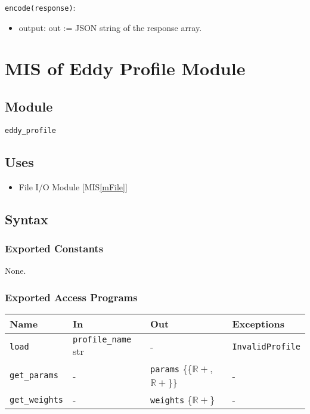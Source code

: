 \documentclass[12pt, titlepage]{article}
\begin{document}
\noindent \texttt{encode(response)}:
\begin{itemize}
  \item output: out := JSON string of the response array.
\end{itemize}

\newpage
\section{MIS of Eddy Profile Module} \label{mProf} 

\subsection{Module}
\texttt{eddy\_profile}

\subsection{Uses}
\begin{itemize}
\item File I/O Module [MIS\ref{mFile}]
\end{itemize}

\subsection{Syntax}

\subsubsection{Exported Constants}
None.

\subsubsection{Exported Access Programs}

\begin{center}
\begin{tabular}{p{2.5cm} p{3.5cm} p{5cm} p{4cm}}
\hline
\textbf{Name} & \textbf{In} & \textbf{Out} & \textbf{Exceptions} \\
\hline
\texttt{load} & \texttt{profile\_name} str & - & \texttt{InvalidProfile} \\
\texttt{get\_params}& - & \texttt{params} \{{\{$\mathbb{R+}$, $\mathbb{R+}$\}}\} & - \\
\texttt{get\_weights}& - & \texttt{weights} \{$\mathbb{R+}$\} & - \\
\hline
\end{tabular}
\end{center}
\end{document}
